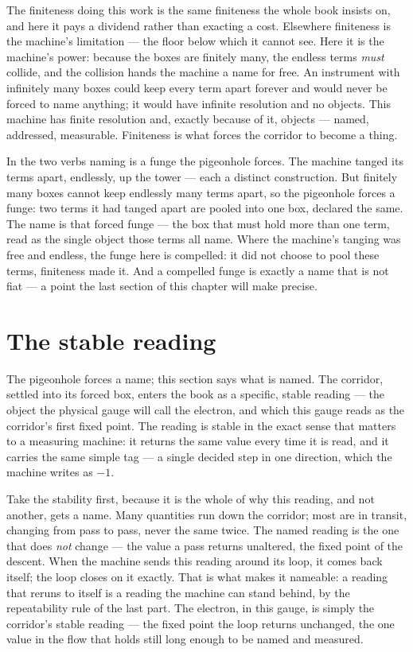 The finiteness doing this work is the same finiteness the whole book insists on, and here it pays a dividend rather than
exacting a cost. Elsewhere finiteness is the machine's limitation --- the floor below which it cannot see. Here it is the
machine's power: because the boxes are finitely many, the endless terms \emph{must} collide, and the collision hands the
machine a name for free. An instrument with infinitely many boxes could keep every term apart forever and would never be
forced to name anything; it would have infinite resolution and no objects. This machine has finite resolution and,
exactly because of it, objects --- named, addressed, measurable. Finiteness is what forces the corridor to become a
thing.

In the two verbs naming is a funge the pigeonhole forces. The machine tanged its terms apart, endlessly, up the tower ---
each a distinct construction. But finitely many boxes cannot keep endlessly many terms apart, so the pigeonhole forces a
funge: two terms it had tanged apart are pooled into one box, declared the same. The name is that forced funge --- the
box that must hold more than one term, read as the single object those terms all name. Where the machine's tanging was
free and endless, the funge here is compelled: it did not choose to pool these terms, finiteness made it. And a compelled
funge is exactly a name that is not fiat --- a point the last section of this chapter will make precise.

\section{The stable reading}

The pigeonhole forces a name; this section says what is named. The corridor, settled into its forced box, enters the
book as a specific, stable reading --- the object the physical gauge will call the electron, and which this gauge reads
as the corridor's first fixed point. The reading is stable in the exact sense that matters to a measuring machine: it
returns the same value every time it is read, and it carries the same simple tag --- a single decided step in one
direction, which the machine writes as $-1$.

Take the stability first, because it is the whole of why this reading, and not another, gets a name. Many quantities run
down the corridor; most are in transit, changing from pass to pass, never the same twice. The named reading is the one
that does \emph{not} change --- the value a pass returns unaltered, the fixed point of the descent. When the machine
sends this reading around its loop, it comes back itself; the loop closes on it exactly. That is what makes it nameable:
a reading that reruns to itself is a reading the machine can stand behind, by the repeatability rule of the last part. The
electron, in this gauge, is simply the corridor's stable reading --- the fixed point the loop returns unchanged, the one
value in the flow that holds still long enough to be named and measured.

